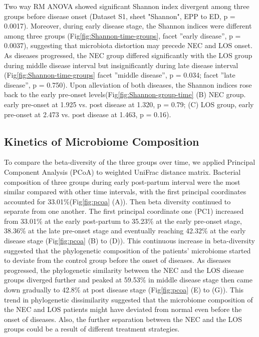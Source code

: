\documentclass[fleqn,10pt]{wlpeerj} %
\begin{document}
    Two way RM ANOVA showed significant Shannon index divergent among three groups before disease onset (Dataset S1, sheet "Shannon", EPP to ED, p = 0.0017). Moreover, during early disease stage, the Shannon indices were different among three groups (Fig\ref{fig:Shannon-time-groups}, facet ”early disease”, p = 0.0037), suggesting that microbiota distortion may precede NEC and LOS onset. As diseases progressed, the NEC group differed significantly with the LOS group during middle disease interval but insignificantly  during late disease interval (Fig\ref{fig:Shannon-time-groups} facet ”middle disease”, p = 0.034; facet ”late disease”, p = 0.750). Upon alleviation of both diseases, the Shannon indices rose back to the early pre-onset levels(Fig\ref{fig:Shannon-group-time} (B) NEC group. early pre-onset at 1.925 vs. post disease at 1.320, p = 0.79; (C) LOS group, early pre-onset at 2.473 vs. post disease at 1.463, p = 0.16).


    \subsection*{Kinetics of Microbiome Composition}
    To compare the beta-diversity of the three groups over time, we applied Principal Component Analysis (PCoA) to weighted UniFrac distance matrix.
    Bacterial composition of three groups during early post-partum interval were the most similar compared with other time intervals, with the first principal coordinates accounted for 33.01\%(Fig\ref{fig:pcoa} (A)). Then beta diversity continued to separate from one another. The first principal coordinate one (PC1) increased from 33.01\% at the early post-partum to 35.23\% at the early pre-onset stage, 38.36\% at the late pre-onset stage and eventually reaching 42.32\% at the early disease stage (Fig\ref{fig:pcoa} (B) to (D)).  This continuous increase in beta-diversity suggested that the phylogenetic composition of the patients’ microbiome started to deviate from the control group before the onset of diseases. As diseases progressed, the phylogenetic similarity between the NEC and the LOS disease groups diverged further and peaked at 59.53\% in middle disease stage then came down gradually to 42.8\% at post disease stage (Fig\ref{fig:pcoa} (E) to (G)). This trend in phylogenetic dissimilarity suggested that the microbiome composition of the NEC and LOS patients might have deviated from normal even before the onset of diseases.  Also, the further separation between the NEC and the LOS groups could be a result of different treatment strategies.
\end{document}
